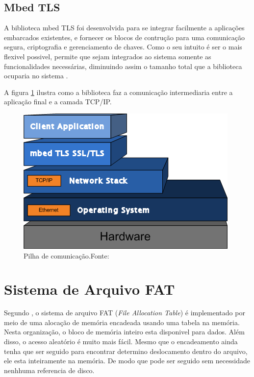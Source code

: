 \subsection{Mbed TLS}
A biblioteca mbed TLS foi desenvolvida para se integrar facilmente a aplicações embarcados existentes, e fornecer os blocos de contrução para uma comunicação segura, criptografia e gerenciamento de chaves. Como o seu intuito é ser o mais flexivel possivel, permite que sejam integrados ao sistema somente as funcionalidades necessárias, diminuindo assim o tamanho total que a biblioteca ocuparia no sistema \cite{mbedtls}.

A figura \ref{mbedtlsFig} ilustra como a biblioteca faz a comunicação intermediaria entre a aplicação final e a camada TCP/IP.

\begin{figure}[H]
    \scriptsize
     \centering
     \includegraphics[scale=1]{dados/figuras/mbedtls.png}
     \caption{Pilha de comunicação.\newline Fonte:\cite{mbedtls}}
     \label{mbedtlsFig}
\end{figure}



\section{\textbf{Sistema de Arquivo FAT}}

Segundo , o sistema de arquivo FAT (\textit{File Allocation Table}) é implementado por meio de uma alocação de memória encadeada usando uma tabela na memória. Nesta organização, o bloco de memória inteiro esta disponivel para dados. Além disso, o acesso aleatório é muito mais fácil. Mesmo que o encadeamento ainda tenha que ser seguido para encontrar determino deslocamento dentro do arquivo, ele esta inteiramente na memória. De modo que pode ser seguido sem necessidade nenhhuma referencia de disco.

